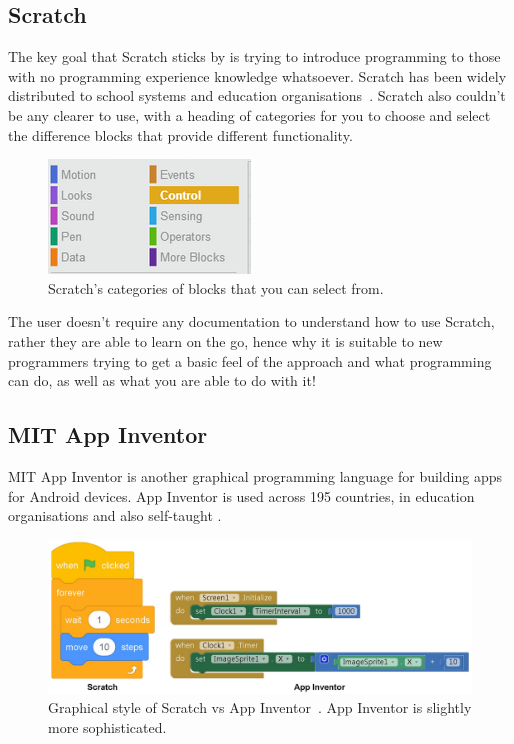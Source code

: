 \documentclass[a4paper, 12pt]{article}
\begin{document}
        \subsection{Scratch}
            The key goal that Scratch sticks by is trying to introduce programming to those with no
            programming experience knowledge whatsoever. Scratch has been widely distributed to school
            systems and education organisations~\cite{maloney2010scratch}. Scratch also couldn't be any
            clearer to use, with a heading of categories for you to choose and select the difference
            blocks that provide different functionality.

            \begin{figure}[h]
                \centering
                \includegraphics{scratch_blocks.png}
                \caption{Scratch's categories of blocks that you can select from.}
            \end{figure}

            The user doesn't require any documentation to understand how to use Scratch, rather they
            are able to learn on the go, hence why it is suitable to new programmers trying to get a
            basic feel of the approach and what programming can do, as well as what you are able to
            do with it!

        \subsection{MIT App Inventor}
            MIT App Inventor is another graphical programming language for building apps for Android devices.
            App Inventor is used across 195 countries, in education organisations and also self-taught
            \cite{xie2016skill}. 

            \begin{figure}[h]
                \centering
                \includegraphics[width=125mm]{scratch_vs_appinventor.png}
                \caption{Graphical style of Scratch vs App Inventor~\cite{park2019comparing}. App Inventor is slightly more sophisticated.}
            \end{figure}
\end{document}
